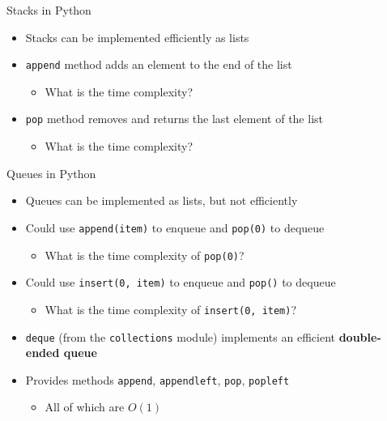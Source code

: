 \begin{frame}{Stacks in Python}
	\begin{itemize}
		\pause\item Stacks can be implemented efficiently as lists
		\pause\item \lstinline{append} method adds an element to the end of the list
			\begin{itemize}
				\pause\item What is the time complexity?
			\end{itemize}
		\pause\item \lstinline{pop} method removes and returns the last element of the list
			\begin{itemize}
				\pause\item What is the time complexity?
			\end{itemize}
	\end{itemize}
\end{frame}

\begin{frame}{Queues in Python}
	\begin{itemize}
		\pause\item Queues can be implemented as lists, but not efficiently
		\pause\item Could use \lstinline{append(item)} to enqueue and \lstinline{pop(0)} to dequeue
			\begin{itemize}
				\pause\item What is the time complexity of \lstinline{pop(0)}?
			\end{itemize}
		\pause\item Could use \lstinline{insert(0, item)} to enqueue and \lstinline{pop()} to dequeue
			\begin{itemize}
				\pause\item What is the time complexity of \lstinline{insert(0, item)}?
			\end{itemize}
		\pause\item \lstinline{deque} (from the \lstinline{collections} module) implements an efficient
			\textbf{double-ended queue}
		\pause\item Provides methods \lstinline{append}, \lstinline{appendleft}, \lstinline{pop}, \lstinline{popleft}
			\begin{itemize}
				\pause\item All of which are $O(1)$
			\end{itemize}
	\end{itemize}
\end{frame}

